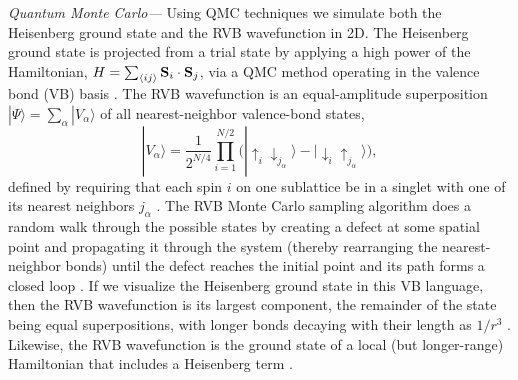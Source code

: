 \documentclass[prl,aps,twocolumn,floatfix,amsmath,amssymb,superscriptaddress,tightenlines]{revtex4}
\begin{document}
{\it Quantum Monte Carlo---}
Using QMC techniques we simulate both the
Heisenberg ground state and the RVB
wavefunction in 2D.  The Heisenberg ground state is
projected from a trial state by applying a high power of the
Hamiltonian, $H = \sum_{\langle ij \rangle} {\bf S}_i \cdot {\bf S}_j$, via a QMC method operating in the valence bond (VB)
basis \cite{Sandvik}. 
The RVB wavefunction 
is an equal-amplitude superposition 
$| \Psi \rangle = \sum_{\alpha} | V_{\alpha} \rangle$
of all nearest-neighbor valence-bond states, 
\begin{equation}
|V_{\alpha} \rangle =  \frac{1}{2^{N/4}} \prod_{i=1}^{N/2} \big( | \uparrow_i \downarrow_{j_{\alpha}} \rangle -  | \downarrow_i  \uparrow_{j_{\alpha}} \rangle \big),
\end{equation}
 defined by requiring that each spin $i$ on one sublattice be in a singlet with one of its nearest neighbors $j_\alpha$ \cite{RVB1,RVB2}. The RVB 
Monte Carlo sampling
algorithm does a random walk through the possible states by creating a
defect at some spatial point and propagating it through the system (thereby
rearranging the nearest-neighbor bonds) until the defect reaches the
initial point and its path forms a closed loop \cite{AWSloop}.
If we visualize the Heisenberg ground state in this VB language, then the RVB wavefunction is its largest component, the remainder of the state being equal superpositions, with longer bonds decaying with their length as $1/r^3$ \cite{Sandvik}.  Likewise, the RVB wavefunction is the ground state of a local (but longer-range) Hamiltonian that includes a Heisenberg term \cite{Cano}.
\end{document}
